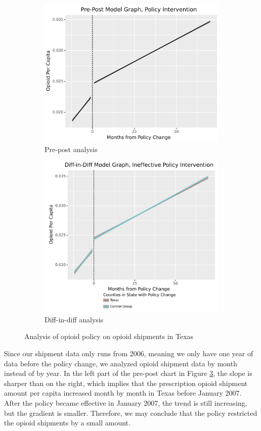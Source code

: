 \documentclass[12pt,letterpaper]{article}
\begin{document}
\begin{figure}[!h]
\centering
\begin{subfigure}{.5\textwidth}
  \centering
  \includegraphics[width=0.7\linewidth]{../30_results/Bonus_Results/texas_opioid_shipment_prepost_monthly.png}
  \caption{Pre-post analysis}
  \label{fig:tx_ship_prepost}
\end{subfigure}%
\begin{subfigure}{.55\textwidth}
  \centering
  \includegraphics[width=0.7\linewidth]{../30_results/Bonus_Results/texas_opioid_shipment_diffdiff_monthly.png}
  \caption{Diff-in-diff analysis}
  \label{fig:tx_ship_did}
\end{subfigure}
\caption{Analysis of opioid policy on opioid shipments in Texas}
\label{fig:tx_ship}
\end{figure}
Since our shipment data only runs from 2006, meaning we only have one year of data before the policy change, we analyzed opioid shipment data by month instead of by year. In the left part of the pre-post chart in Figure \ref{fig:tx_ship}, the slope is sharper than on the right, which implies that the prescription opioid shipment amount per capita increased month by month in Texas before January 2007. After the policy became effective in January 2007, the trend is still increasing, but the gradient is smaller. Therefore, we may conclude that the policy restricted the opioid shipments by a small amount.
\end{document}
